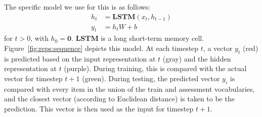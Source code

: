 \documentclass{article}
\newcommand{\Figref}[1]{Figure~\ref{#1}}
\newcommand{\LSTM}{\textbf{LSTM}}
\begin{document}
The specific model we use for this is as follows:
%
\begin{align}
  h_{t} &= \LSTM(x_{t}, h_{t-1}) \label{eq:lstm-recur-supp}\\
  y_{t} &= h_{t}W + b\label{eq:lstm-predict-supp}
\end{align}
%
for $t > 0$, with $h_{0} = \mathbf{0}$. $\LSTM$ is a long short-term memory cell. \Figref{fig:reps:sequence} depicts this model. At each timestep $t$, a vector $y_{t}$ (red) is predicted based on the input representation at $t$ (gray) and the hidden representation at $t$ (purple). During training, this is compared with the actual vector for timestep $t+1$ (green). During testing, the predicted vector $y_{i}$ is compared with every item in the union of the train and assessment vocabularies, and the closest vector (according to Euclidean distance) is taken to be the prediction. This vector is then used as the input for timestep $t+1$.
\end{document}
